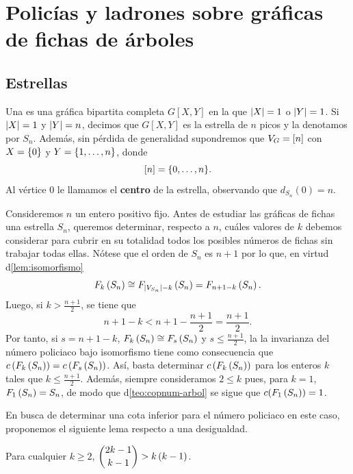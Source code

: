 \chapter{Polic\'ias y ladrones sobre gr\'aficas de fichas de \'arboles}
\label{cap:resultados}

\section{Estrellas}
\label{sec:estrellas}

Una  es una gr\'afica bipartita completa $G[X,Y]$ en la que
$\left|X\right|=1$ o $\left|Y\right|=1$. Si $\left|X\right|=1$ y $\left|Y\right|=n$, decimos que $G[X,Y]$ es
la estrella de $n$ picos y la denotamos por $S_n$. Adem\'as, sin p\'erdida de
generalidad supondremos que $V_G=\left[ n\right]$ con $X=\left\{ 0\right\}$ y $Y=\{1,\dots, n\}$, donde
\[
  \left[ n\right]=\{0,\dots, n\}.
\]
Al v\'ertice $0$ le llamamos el \textbf{centro} de
la estrella, observando que $d_{S_n}(0) = n$.

Consideremos $n$ un entero positivo fijo. Antes de estudiar las gr\'aficas de
fichas una estrella $S_n$, queremos determinar, respecto a $n$, cu\'ales valores
de $k$ debemos considerar para cubrir en su totalidad todos los posibles
n\'umeros de fichas sin trabajar todas ellas. N\'otese que el orden de $S_n$ es
$n+1$ por lo que, en virtud d\cref{lem:isomorfismo}
\[
    F_{k}\left( S_n\right) \cong F_{\left|V_{S_n}\right|-k}\left( S_n\right) = F_{n+1-k}\left( S_n\right).
\]
Luego, si $k>\frac{n+1}{2}$, se tiene que
\[
n+1-k<n+1-\frac{n+1}{2} = \frac{n+1}{2}.
\]
Por tanto, si $s=n+1-k$, $F_{k}\left( S_n\right) \cong F_{s}\left( S_n\right)$ y $s\leq \frac{n+1}{2}$,
la la invarianza del n\'umero policiaco bajo isomorfismo tiene como consecuencia
que $c\left( F_{k}\left( S_n\right)\right) = c\left( F_{s}\left( S_n\right)\right)$. As\'i, basta determinar
$c\left( F_{k}\left( S_n\right)\right)$ para los enteros $k$ tales que $k\leq \frac{n+1}{2}$.
Adem\'as, siempre consideramos $2\leq k$ pues, para $k=1$, $F_{1}\left( S_n\right)=S_n$, de
modo que d\cref{teo:copnum-arbol} se sigue que $c(F_{1}\left( S_n\right))=1$.

En busca de determinar una cota inferior para el n\'umero policiaco en este
caso, proponemos el siguiente lema respecto a una desigualdad.

\begin{lema}
\label{lem:desigualdad}
    Para cualquier $k\geq 2$, $\displaystyle\binom{2k-1}{k-1} > k\left( k-1\right)$.
\end{lema}

